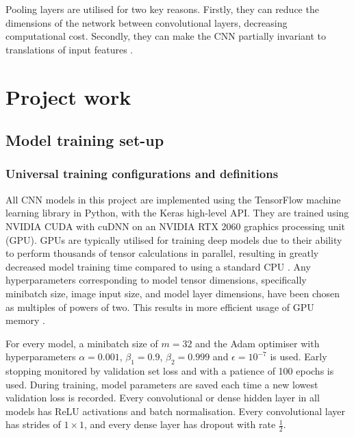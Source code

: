 \documentclass[12pt]{article}
\begin{document}
Pooling layers are utilised for two key reasons. Firstly, they can reduce the dimensions of the network between convolutional layers, decreasing computational cost. Secondly, they can make the CNN partially invariant to translations of input features \cite{Aghdam17, Goodfellow16}.
\section{Project work}
\subsection{Model training set-up}
\subsubsection{Universal training configurations and definitions}
All CNN models in this project are implemented using the TensorFlow machine learning library in Python, with the Keras high-level API. They are trained using NVIDIA CUDA with cuDNN on an NVIDIA RTX 2060 graphics processing unit (GPU). GPUs are typically utilised for training deep models due to their ability to perform thousands of tensor calculations in parallel, resulting in greatly decreased model training time compared to using a standard CPU \cite{Shi16, Goodfellow16}. Any hyperparameters corresponding to model tensor dimensions, specifically minibatch size, image input size, and model layer dimensions, have been chosen as multiples of powers of two. This results in more efficient usage of GPU memory \cite{Goodfellow16}. 

For every model, a minibatch size of $m=32$ and the Adam optimiser with hyperparameters $\alpha=0.001$, $\beta_1=0.9$, $\beta_2=0.999$ and $\epsilon=10^{-7}$ is used. Early stopping  monitored by validation set loss and with a patience of 100 epochs is used. During training, model parameters are saved each time a new lowest validation loss is recorded. Every convolutional or dense hidden layer in all models has ReLU activations and batch normalisation. Every convolutional layer has strides of $1 \times 1$, and every dense layer has dropout with rate $\frac{1}{2}$.
\end{document}
